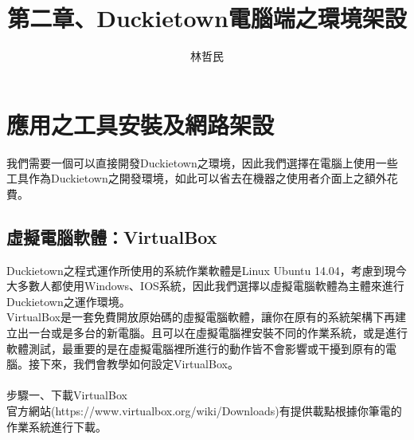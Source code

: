 \documentclass{article}
\title{第二章、Duckietown電腦端之環境架設}
\author{林哲民}
\date{} %
\begin{document}
\maketitle

\section{應用之工具安裝及網路架設}

我們需要一個可以直接開發Duckietown之環境，因此我們選擇在電腦上使用一些工具作為Duckietown之開發環境，如此可以省去在機器之使用者介面上之額外花費。
\subsection{虛擬電腦軟體：VirtualBox}

Duckietown之程式運作所使用的系統作業軟體是Linux Ubuntu 14.04，考慮到現今大多數人都使用Windows、IOS系統，因此我們選擇以虛擬電腦軟體為主體來進行Duckietown之運作環境。
\\VirtualBox是一套免費開放原始碼的虛擬電腦軟體，讓你在原有的系統架構下再建立出一台或是多台的新電腦。且可以在虛擬電腦裡安裝不同的作業系統，或是進行軟體測試，最重要的是在虛擬電腦裡所進行的動作皆不會影響或干擾到原有的電腦。接下來，我們會教學如何設定VirtualBox。
\\
\\步驟一、下載VirtualBox
\\官方網站(https://www.virtualbox.org/wiki/Downloads)有提供載點根據你筆電的作業系統進行下載。
\end{document}
